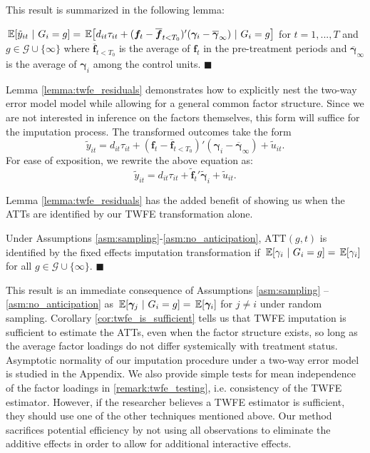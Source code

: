 \documentclass[12pt]{article}
\def\ATT{\text{ATT}}
\begin{document}
This result is summarized in the following lemma:
\begin{lemma}\label{lemma:twfe_residuals}
  $\expec{\tilde{y}_{it}}{G_i = g} = \expec{d_{it}\tau_{it} + (\bm f_t - \overline{\bm f}_{t < T_0})' (\bm \gamma_i - \overline{\bm \gamma}_{\infty}) }{G_i = g}$ for $t = 1,...,T$ and $g \in \mathcal{G} \cup \{ \infty \}$ where $\overline{\bm f}_{t < T_0}$ is the average of $\bm f_t$ in the pre-treatment periods and $\overline{\bm\gamma}_\infty$ is the average of $\bm \gamma_i$ among the control units. $\blacksquare$
\end{lemma}

Lemma \ref{lemma:twfe_residuals} demonstrates how to explicitly nest the two-way error model model while allowing for a general common factor structure. Since we are not interested in inference on the factors themselves, this form will suffice for the imputation process. The transformed outcomes take the form
\begin{equation}
  \tilde{y}_{it} = d_{it} \tau_{it} + (\bm f_t - \overline{\bm f}_{t < T_0})' (\bm \gamma_i - \overline{\bm \gamma}_\infty) + \tilde{u}_{it}.
\end{equation}
For ease of exposition, we rewrite the above equation as:
\begin{equation}
  \tilde{y}_{it} = d_{it} \tau_{it} + \tilde{\bm f}_t' \tilde{\bm \gamma}_i + \tilde{u}_{it}.
\end{equation}

Lemma \ref{lemma:twfe_residuals} has the added benefit of showing us when the ATTs are identified by our TWFE transformation alone.
\begin{corollary}\label{cor:twfe_is_sufficient}
  Under Assumptions \ref{asm:sampling}-\ref{asm:no_anticipation}, $\ATT(g,t)$ is identified by the fixed effects imputation transformation if $\expec{\gamma_i}{G_i=g} = \expec{\gamma_i}$ for all $g \in \mathcal{G} \cup \{\infty\}$. $\blacksquare$
\end{corollary}
This result is an immediate consequence of Assumptions \ref{asm:sampling} -- \ref{asm:no_anticipation} as $\expec{\bm \gamma_j}{G_i = g} = \expec{\bm \gamma_i}$ for $j \neq i$ under random sampling. 
Corollary \ref{cor:twfe_is_sufficient} tells us that TWFE imputation is sufficient to estimate the ATTs, even when the factor structure exists, so long as the average factor loadings do not differ systemically with treatment status. Asymptotic normality of our imputation procedure under a two-way error model is studied in the Appendix. We also provide simple tests for mean independence of the factor loadings in \autoref{remark:twfe_testing}, i.e. consistency of the TWFE estimator. However, if the researcher believes a TWFE estimator is sufficient, they should use one of the other techniques mentioned above. Our method sacrifices potential efficiency by not using all observations to eliminate the additive effects in order to allow for additional interactive effects.
\end{document}
